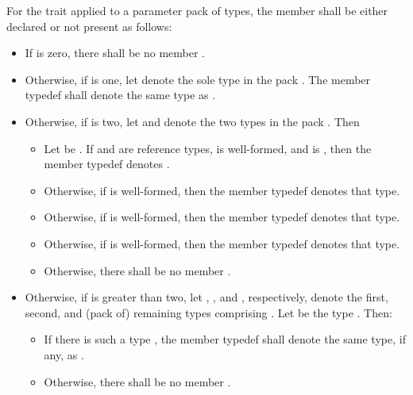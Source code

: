 \pnum
For the  trait applied to a parameter pack
 of types, the member  shall be either declared or not
present as follows:
\begin{itemize}
\item If  is zero, there shall be no member .

\item Otherwise, if  is one, let  denote the sole
  type in the pack . The member typedef  shall denote the
  same type as .

\item Otherwise, if  is two, let  and 
  denote the two types in the pack . Then
  \begin{itemize}
  \item Let  be .
    If  and  are reference types,
     is well-formed, and
     is ,
    then the member typedef  denotes .

  \item Otherwise, if
    is well-formed, then the member typedef  denotes that type.

  \item Otherwise, if  is well-formed,
    then the member typedef  denotes that type.

  \item Otherwise, if  is well-formed, then the
    member typedef  denotes that type.

  \item Otherwise, there shall be no member .
  \end{itemize}

\item Otherwise, if  is greater than two, let ,
  , and , respectively, denote the first, second, and
  (pack of) remaining types comprising . Let  be the type
  . Then:
  \begin{itemize}
  \item If there is such a type , the member typedef  shall
    denote the same type, if any, as .

  \item Otherwise, there shall be no member .
  \end{itemize}
\end{itemize}

